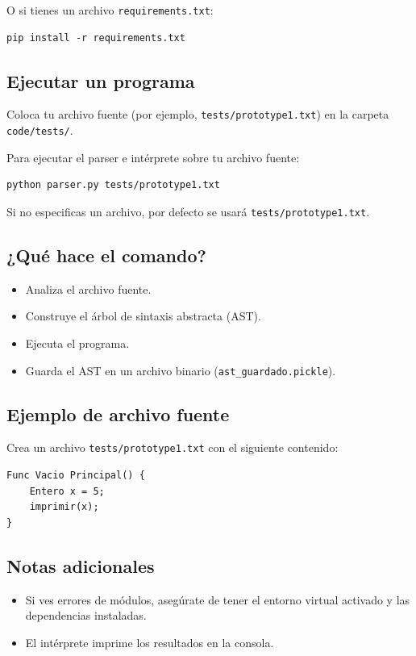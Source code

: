 \documentclass{article}
\begin{document}
O si tienes un archivo \texttt{requirements.txt}:
\begin{verbatim}
pip install -r requirements.txt
\end{verbatim}

\subsection{Ejecutar un programa}
Coloca tu archivo fuente (por ejemplo, \texttt{tests/prototype1.txt}) en la carpeta \texttt{code/tests/}.

Para ejecutar el parser e intérprete sobre tu archivo fuente:
\begin{verbatim}
python parser.py tests/prototype1.txt
\end{verbatim}

Si no especificas un archivo, por defecto se usará \texttt{tests/prototype1.txt}.

\subsection{¿Qué hace el comando?}
\begin{itemize}
    \item Analiza el archivo fuente.
    \item Construye el árbol de sintaxis abstracta (AST).
    \item Ejecuta el programa.
    \item Guarda el AST en un archivo binario (\texttt{ast\_guardado.pickle}).
\end{itemize}

\subsection{Ejemplo de archivo fuente}
Crea un archivo \texttt{tests/prototype1.txt} con el siguiente contenido:

\begin{verbatim}
Func Vacio Principal() {
    Entero x = 5;
    imprimir(x);
}
\end{verbatim}

\subsection{Notas adicionales}
\begin{itemize}
    \item Si ves errores de módulos, asegúrate de tener el entorno virtual activado y las dependencias instaladas.
    \item El intérprete imprime los resultados en la consola.
\end{itemize}
\end{document}

